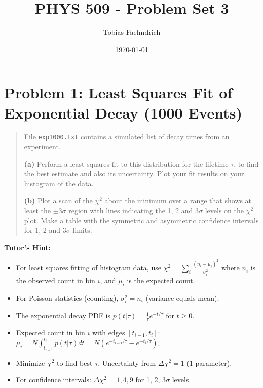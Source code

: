 \documentclass[11pt]{article}
\title{PHYS 509 - Problem Set 3}
\author{Tobias Faehndrich}
\date{\today}
\begin{document}
\maketitle

\tableofcontents
\newpage

\section{Problem 1: Least Squares Fit of Exponential Decay (1000 Events)}

\begin{quote}
    File \texttt{exp1000.txt} contains a simulated list of decay times from an experiment.

    \textbf{(a)} Perform a least squares fit to this distribution for the lifetime $\tau$, to find the best estimate and also its uncertainty. Plot your fit results on your histogram of the data.

    \textbf{(b)} Plot a scan of the $\chi^2$ about the minimum over a range that shows at least the $\pm 3\sigma$ region with lines indicating the 1, 2 and 3$\sigma$ levels on the $\chi^2$ plot. Make a table with the symmetric and asymmetric confidence intervals for 1, 2 and 3$\sigma$ limits.
\end{quote}

\divider

\textbf{Tutor's Hint:}
\begin{itemize}
    \item For least squares fitting of histogram data, use $\chi^2 = \sum_i \frac{(n_i - \mu_i)^2}{\sigma_i^2}$ where $n_i$ is the observed count in bin $i$, and $\mu_i$ is the expected count.
    \item For Poisson statistics (counting), $\sigma_i^2 = n_i$ (variance equals mean).
    \item The exponential decay PDF is $p(t|\tau) = \frac{1}{\tau}e^{-t/\tau}$ for $t \geq 0$.
    \item Expected count in bin $i$ with edges $[t_{i-1}, t_i]$: $\mu_i = N \int_{t_{i-1}}^{t_i} p(t|\tau) dt = N(e^{-t_{i-1}/\tau} - e^{-t_i/\tau})$.
    \item Minimize $\chi^2$ to find best $\tau$. Uncertainty from $\Delta\chi^2 = 1$ (1 parameter).
    \item For confidence intervals: $\Delta\chi^2 = 1, 4, 9$ for 1, 2, 3$\sigma$ levels.
\end{itemize}
\end{document}

